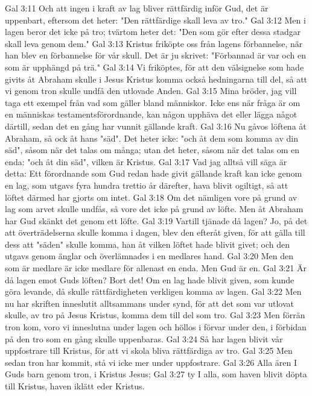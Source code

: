 Gal 3:11  Och att ingen i kraft av lag bliver rättfärdig inför Gud, det är uppenbart, eftersom det heter: "Den rättfärdige skall leva av tro."
Gal 3:12  Men i lagen beror det icke på tro; tvärtom heter det: "Den som gör efter dessa stadgar skall leva genom dem."
Gal 3:13  Kristus friköpte oss från lagens förbannelse, när han blev en förbannelse för vår skull. Det är ju skrivet: "Förbannad är var och en som är upphängd på trä."
Gal 3:14  Vi friköptes, för att den välsignelse som hade givits åt Abraham skulle i Jesus Kristus komma också hedningarna till del, så att vi genom tron skulle undfå den utlovade Anden.
Gal 3:15  Mina bröder, jag vill taga ett exempel från vad som gäller bland människor. Icke ens när fråga är om en människas testamentsförordnande, kan någon upphäva det eller lägga något därtill, sedan det en gång har vunnit gällande kraft.
Gal 3:16  Nu gåvos löftena åt Abraham, så ock åt hans "säd". Det heter icke: "och åt dem som komma av din säd", såsom när det talas om många; utan det heter, såsom när det talas om en enda: "och åt din säd", vilken är Kristus.
Gal 3:17  Vad jag alltså vill säga är detta: Ett förordnande som Gud redan hade givit gällande kraft kan icke genom en lag, som utgavs fyra hundra trettio år därefter, hava blivit ogiltigt, så att löftet därmed har gjorts om intet.
Gal 3:18  Om det nämligen vore på grund av lag som arvet skulle undfås, så vore det icke på grund av löfte. Men åt Abraham har Gud skänkt det genom ett löfte.
Gal 3:19  Vartill tjänade då lagen? Jo, på det att överträdelserna skulle komma i dagen, blev den efteråt given, för att gälla till dess att "säden" skulle komma, han åt vilken löftet hade blivit givet; och den utgavs genom änglar och överlämnades i en medlares hand.
Gal 3:20  Men den som är medlare är icke medlare för allenast en enda. Men Gud är en.
Gal 3:21  Är då lagen emot Guds löften? Bort det! Om en lag hade blivit given, som kunde göra levande, då skulle rättfärdigheten verkligen komma av lagen.
Gal 3:22  Men nu har skriften inneslutit alltsammans under synd, för att det som var utlovat skulle, av tro på Jesus Kristus, komma dem till del som tro.
Gal 3:23  Men förrän tron kom, voro vi inneslutna under lagen och höllos i förvar under den, i förbidan på den tro som en gång skulle uppenbaras.
Gal 3:24  Så har lagen blivit vår uppfostrare till Kristus, för att vi skola bliva rättfärdiga av tro.
Gal 3:25  Men sedan tron har kommit, stå vi icke mer under uppfostrare.
Gal 3:26  Alla ären I Guds barn genom tron, i Kristus Jesus;
Gal 3:27  ty I alla, som haven blivit döpta till Kristus, haven iklätt eder Kristus.
